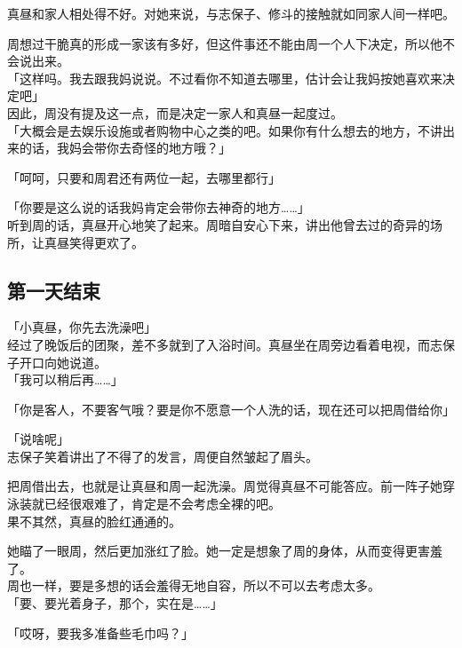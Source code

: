 真昼和家人相处得不好。对她来说，与志保子、修斗的接触就如同家人间一样吧。

周想过干脆真的形成一家该有多好，但这件事还不能由周一个人下决定，所以他不会说出来。\\

「这样吗。我去跟我妈说说。不过看你不知道去哪里，估计会让我妈按她喜欢来决定吧」\\

因此，周没有提及这一点，而是决定一家人和真昼一起度过。\\

「大概会是去娱乐设施或者购物中心之类的吧。如果你有什么想去的地方，不讲出来的话，我妈会带你去奇怪的地方哦？」

「呵呵，只要和周君还有两位一起，去哪里都行」

「你要是这么说的话我妈肯定会带你去神奇的地方……」\\

听到周的话，真昼开心地笑了起来。周暗自安心下来，讲出他曾去过的奇异的场所，让真昼笑得更欢了。
\subsection{第一天结束}

「小真昼，你先去洗澡吧」\\

经过了晚饭后的团聚，差不多就到了入浴时间。真昼坐在周旁边看着电视，而志保子开口向她说道。\\

「我可以稍后再……」

「你是客人，不要客气哦？要是你不愿意一个人洗的话，现在还可以把周借给你」

「说啥呢」\\

志保子笑着讲出了不得了的发言，周便自然皱起了眉头。

把周借出去，也就是让真昼和周一起洗澡。周觉得真昼不可能答应。前一阵子她穿泳装就已经很艰难了，肯定是不会考虑全裸的吧。\\

果不其然，真昼的脸红通通的。

她瞄了一眼周，然后更加涨红了脸。她一定是想象了周的身体，从而变得更害羞了。\\

周也一样，要是多想的话会羞得无地自容，所以不可以去考虑太多。\\

「要、要光着身子，那个，实在是……」

「哎呀，要我多准备些毛巾吗？」

